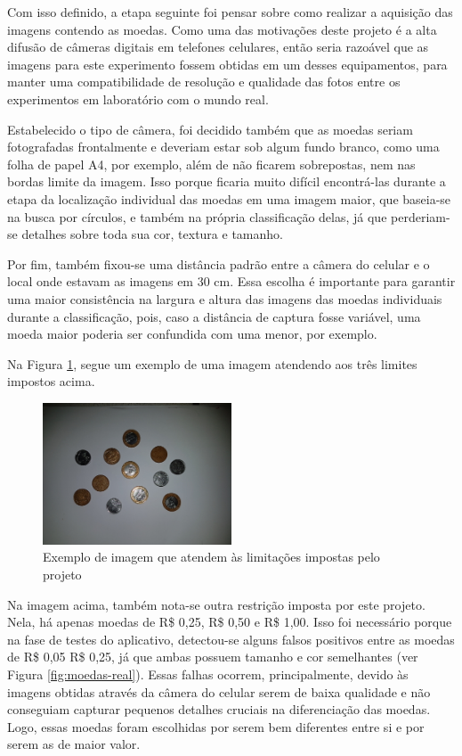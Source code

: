 \documentclass[10pt,journal]{IEEEtran}
\begin{document}
Com isso definido, a etapa seguinte foi pensar sobre como realizar a aquisição das imagens contendo as moedas. Como uma das motivações deste projeto é a alta difusão de câmeras digitais em telefones celulares, então seria razoável que as imagens para este experimento fossem obtidas em um desses equipamentos, para manter uma compatibilidade de resolução e qualidade das fotos entre os experimentos em laboratório com o mundo real. 

Estabelecido o tipo de câmera, foi decidido também que as moedas seriam fotografadas frontalmente e deveriam estar sob algum fundo branco, como uma folha de papel A4, por exemplo, além de não ficarem sobrepostas, nem nas bordas limite da imagem. Isso porque ficaria muito difícil encontrá-las durante a etapa da localização individual das moedas em uma imagem maior, que baseia-se na busca por círculos, e também na própria classificação delas, já que perderiam-se detalhes sobre toda sua cor, textura e tamanho. 

Por fim, também fixou-se uma distância padrão entre a câmera do celular e o local onde estavam as imagens em 30 cm. Essa escolha é importante para garantir uma maior consistência na largura e altura das imagens das moedas individuais durante a classificação, pois, caso a distância de captura fosse variável, uma moeda maior poderia ser confundida com uma menor, por exemplo.

Na Figura \ref{fig:imagem-exemplo}, segue um exemplo de uma imagem atendendo aos três limites impostos acima.

\begin{figure}[ht]
\centering
\includegraphics[width=0.5\textwidth]{completa4.jpg}
\caption{Exemplo de imagem que atendem às limitações impostas pelo projeto}
\label{fig:imagem-exemplo}
\end{figure}

Na imagem acima, também nota-se outra restrição imposta por este projeto. Nela, há apenas moedas de R\$ 0,25, R\$ 0,50 e R\$ 1,00. Isso foi necessário porque na fase de testes do aplicativo, detectou-se alguns falsos positivos entre as moedas de R\$ 0,05 R\$ 0,25, já que ambas possuem tamanho e cor semelhantes (ver Figura \ref{fig:moedas-real}). Essas falhas ocorrem, principalmente, devido às imagens obtidas através da câmera do celular serem de baixa qualidade e não conseguiam capturar pequenos detalhes cruciais na diferenciação das moedas. Logo, essas moedas foram escolhidas por serem bem diferentes entre si e por serem as de maior valor.
\end{document}
